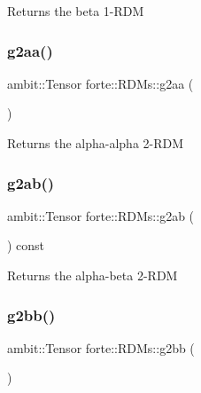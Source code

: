 \begin{DoxyReturn}{Returns}
the beta 1-\/\+R\+DM 
\end{DoxyReturn}
\mbox{\label{classforte_1_1_r_d_ms_a632afec6c1bfe555e0df992d23b1ac6c}} 
\subsubsection{\texorpdfstring{g2aa()}{g2aa()}}
{\footnotesize\ttfamily ambit\+::\+Tensor forte\+::\+R\+D\+Ms\+::g2aa (\begin{DoxyParamCaption}{ }\end{DoxyParamCaption})}

\begin{DoxyReturn}{Returns}
the alpha-\/alpha 2-\/\+R\+DM 
\end{DoxyReturn}
\mbox{\label{classforte_1_1_r_d_ms_a5c2574da5bf2aba775481f0c46fb4202}} 
\subsubsection{\texorpdfstring{g2ab()}{g2ab()}}
{\footnotesize\ttfamily ambit\+::\+Tensor forte\+::\+R\+D\+Ms\+::g2ab (\begin{DoxyParamCaption}{ }\end{DoxyParamCaption}) const\hspace{0.3cm}{\ttfamily [inline]}}

\begin{DoxyReturn}{Returns}
the alpha-\/beta 2-\/\+R\+DM 
\end{DoxyReturn}
\mbox{\label{classforte_1_1_r_d_ms_a60b2559c5aeb5d447335ebcd2897d4ad}} 
\subsubsection{\texorpdfstring{g2bb()}{g2bb()}}
{\footnotesize\ttfamily ambit\+::\+Tensor forte\+::\+R\+D\+Ms\+::g2bb (\begin{DoxyParamCaption}{ }\end{DoxyParamCaption})}

